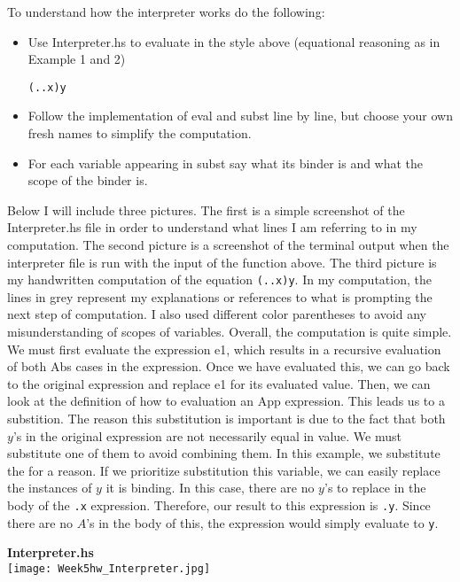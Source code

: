 \documentclass{article}
\theoremstyle{theorem}
\theoremstyle{definition}
\theoremstyle{remark}
\begin{document}
To understand how the interpreter works do the following:
\begin{itemize}
  \item[\ding{99}] Use Interpreter.hs to evaluate in the style above (equational reasoning as in Example 1 and 2)  
  \begin{center}\texttt{(\x.\y.x)y}\end{center} 
  \item[\ding{99}]Follow the implementation of eval and subst line by line, but choose your own fresh names to simplify the computation.
  \item[\ding{99}] For each variable appearing in subst say what its binder is and what the scope of the binder is.
\end{itemize}

Below I will include three pictures. The first is a simple screenshot of the Interpreter.hs file in order to understand what lines I am referring to in my computation. The second picture is a screenshot of the terminal output when the interpreter file is run with the input of the function above. 
The third picture is my handwritten computation of the equation \texttt{(\x.\y.x)y}. 
In my computation, the lines in grey represent my explanations or references to what is prompting the next step of computation. I also used different color parentheses to avoid any misunderstanding of scopes of variables. Overall, the computation is quite simple. 
We must first evaluate the expression e1, which results in a recursive evaluation of both Abs cases in the expression. Once we have evaluated this, we can go back to the original expression and replace e1 for its evaluated value. Then, we can look at the definition of 
how to evaluation an App expression. This leads us to a substition. The reason this substitution is important is due to the fact that both $y$'s in the original expression are not necessarily equal in value. We must substitute one of them to avoid combining them. In this example, 
we substitute the \texttt{\y} for a reason. If we prioritize substitution this variable, we can easily replace the instances of $y$ it is binding. In this case, there are no $y$'s to replace in the body of the \texttt{\y.x} expression. Therefore, our 
result to this expression is \texttt{\A.y}. Since there are no $A$'s in the body of this, the expression would simply evaluate to \texttt{y}.

\begin{samepage}
  \begin{center}
    \textbf{Interpreter.hs}\\
    \texttt{[image: Week5hw\_Interpreter.jpg]}\\
  \end{center}
\end{samepage}
\end{document}
